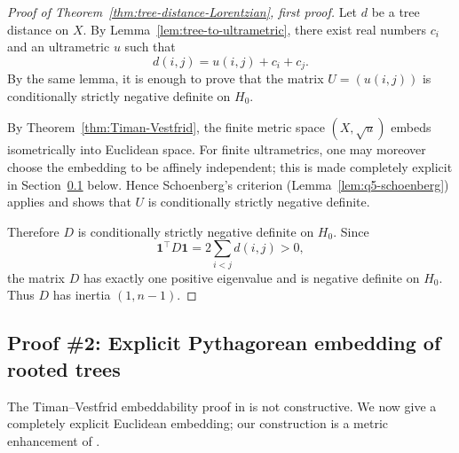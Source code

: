 \documentclass[12pt]{amsart}
\theoremstyle{definition}
\newcommand{\1}{\mathbf{1}}
\begin{document}
\begin{proof}[Proof of Theorem~\ref{thm:tree-distance-Lorentzian}, first proof]
Let $d$ be a tree distance on $X$.  By Lemma~\ref{lem:tree-to-ultrametric}, there
exist real numbers $c_i$ and an ultrametric $u$ such that
\[
d(i,j)=u(i,j)+c_i+c_j.
\]
By the same lemma, it is enough to prove that the matrix $U=(u(i,j))$ is
conditionally strictly negative definite on $H_0$.

By Theorem~\ref{thm:Timan-Vestfrid}, the finite metric space $(X,\sqrt u)$ embeds
isometrically into Euclidean space.  For finite ultrametrics, one may moreover choose
the embedding to be affinely independent; this is made completely explicit in
Section~\ref{app:pythagorean-proof} below.  Hence Schoenberg's criterion (Lemma~\ref{lem:q5-schoenberg})
applies and shows that $U$ is conditionally strictly negative definite.

Therefore $D$ is conditionally strictly negative definite on $H_0$.  Since
\[
\mathbf 1^\top D\mathbf 1=2\sum_{i<j} d(i,j)>0,
\]
the matrix $D$ has exactly one positive eigenvalue and is negative definite on
$H_0$.  Thus $D$ has inertia $(1,n-1)$.
\end{proof}

\subsection{Proof \#2: Explicit Pythagorean embedding of rooted trees}
\label{app:pythagorean-proof}

The Timan--Vestfrid embeddability proof in \cite{TimanVestfrid} is not constructive.
We now give a completely explicit Euclidean embedding; our construction is a metric enhancement of \cite[Theorem 3.6]{MaeharaSurvey}.
\end{document}

